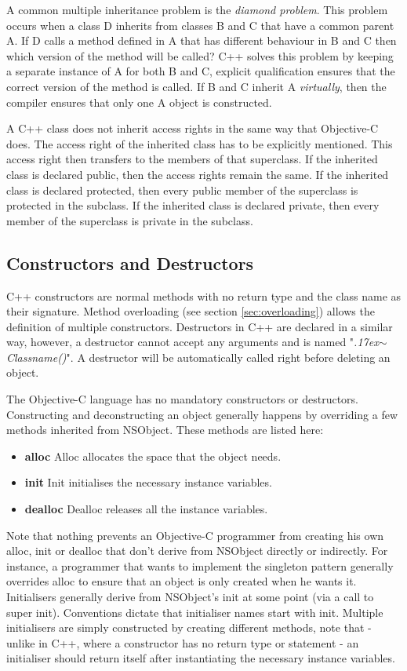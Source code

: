 \documentclass[12pt, a4paper, twocolumn]{article}
\newcommand{\mytilde}{\raise.17ex\hbox{$\scriptstyle\mathtt{\sim}$}}
\begin{document}
A common multiple inheritance problem is the \textit{diamond problem}. This problem occurs when a class D inherits from classes B and C that have a common parent A. If D calls a method defined in A that has different behaviour in B and C then which version of the method will be called? C++ solves this problem by keeping a separate instance of A for both B and C, explicit qualification ensures that the correct version of the method is called. If B and C inherit A \textit{virtually}, then the compiler ensures that only one A object is constructed.

A C++ class does not inherit access rights in the same way that Objective-C does. The access right of the inherited class has to be explicitly mentioned. This access right then transfers to the members of that superclass. If the inherited class is declared public, then the access rights remain the same. If the inherited class is declared protected, then every public member of the superclass is protected in the subclass. If the inherited class is declared private, then every member of the superclass is private in the subclass.

\subsection{Constructors and Destructors}
\label{sec:constructor}
C++ constructors are normal methods with no return type and the class name as their signature. Method overloading (see section \ref{sec:overloading}) allows the definition of multiple constructors. Destructors in C++ are declared in a similar way, however, a destructor cannot accept any arguments and is named "\textit{\mytilde{}Classname()}". A destructor will be automatically called right before deleting an object.

The Objective-C language has no mandatory constructors or destructors. Constructing and deconstructing an object generally happens by overriding a few methods inherited from NSObject. These methods are listed here: 
\begin{itemize}
\item \textbf {alloc} Alloc allocates the space that the object needs.
\item \textbf {init} Init initialises the necessary instance variables.
\item \textbf {dealloc} Dealloc releases all the instance variables.
\end{itemize}

Note that nothing prevents an Objective-C programmer from creating his own alloc, init or dealloc that don't derive from NSObject directly or indirectly. For instance, a programmer that wants to implement the singleton pattern generally overrides alloc to ensure that an object is only created when he wants it.
Initialisers generally derive from NSObject's init at some point (via a call to super init). Conventions dictate that initialiser names start with init. Multiple initialisers are simply constructed by creating different methods, note that - unlike in C++, where a constructor has no return type or statement - an initialiser should return itself after instantiating the necessary instance variables.
\end{document}
